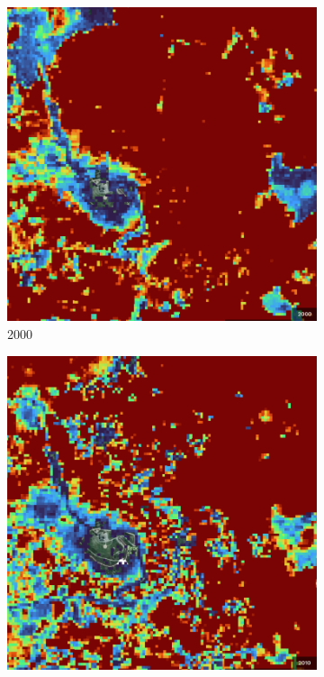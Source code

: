 \begin{figure}[H]
\begin{subfigure}[t]{0.06\textwidth}
        \end{subfigure}
        \hfill
        \begin{subfigure}[t]{0.22\textwidth}
        \centering
        \includegraphics[width=\linewidth,height=\linewidth]{figs_06/brocken_2000.png}
        \caption{2000}
        \end{subfigure}
        \hfill
        \begin{subfigure}[t]{0.22\textwidth}
        \centering
        \includegraphics[width=\linewidth,height=\linewidth]{figs_06/brocken_2010.png}

\end{subfigure}
\end{figure}
